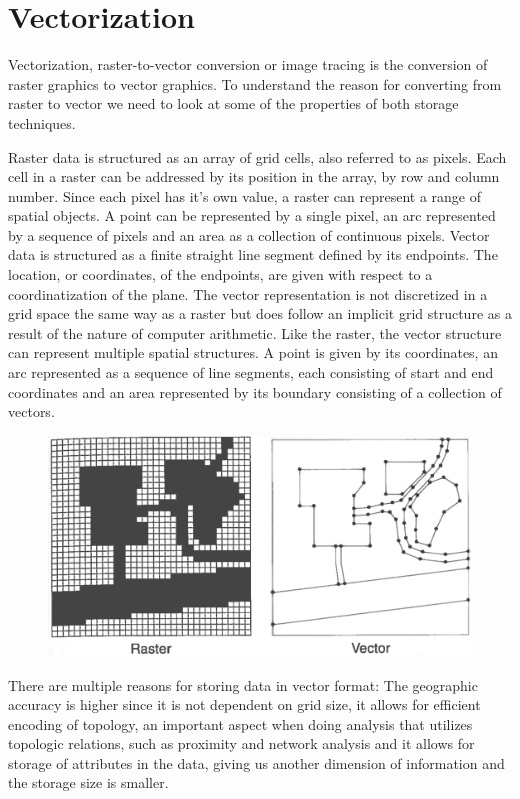 \chapter{Vectorization}\label{chp:vectorization}
Vectorization, raster-to-vector conversion or image tracing is the conversion of raster graphics to vector graphics. To understand the reason for converting from raster to vector we need to look at some of the properties of both storage techniques.

Raster data is structured as an array of grid cells, also referred to as pixels. Each cell in a raster can be addressed by its position in the array, by row and column number. Since each pixel has it's own value, a raster can represent a range of spatial objects. A point can be represented by a single pixel, an arc represented by a sequence of pixels and an area as a collection of continuous pixels. Vector data is structured as a finite straight line segment defined by its endpoints. The location, or coordinates, of the endpoints, are given with respect to a coordinatization of the plane. The vector representation is not discretized in a grid space the same way as a raster but does follow an implicit grid structure as a result of the nature of computer arithmetic. Like the raster, the vector structure can represent multiple spatial structures. A point is given by its coordinates, an arc represented as a sequence of line segments, each consisting of start and end coordinates and an area represented by its boundary consisting of a collection of vectors.

\begin{figure}[H]
	\centering
	\includegraphics[width=0.8\linewidth]{fig/rastervector.png}
	\label{fig:rastervsvector}
\end{figure}

There are multiple reasons for storing data in vector format: The geographic accuracy is higher since it is not dependent on grid size, it allows for efficient encoding of topology, an important aspect when doing analysis that utilizes topologic relations, such as proximity and network analysis and it allows for storage of attributes in the data, giving us another dimension of information and the storage size is smaller.

